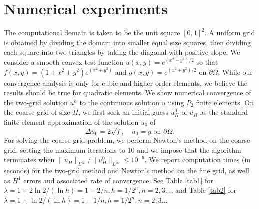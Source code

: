 \documentclass[12pt]{amsart}
\numberwithin{equation}{section}
\begin{document}
\section{Numerical experiments}\label{num}


The computational domain is taken to be the unit square $[0,1]^2$. 
A uniform grid is obtained by dividing the domain into smaller equal size squares, then dividing each square into two triangles by taking the diagonal with positive slope. 
We consider a smooth convex test function $u(x,y)=e^{(x^2+y^2)/2}$ so that 
$f(x,y)=(1+x^2+y^2)e^{(x^2+y^2)}$ and $g(x,y)=e^{(x^2+y^2)/2}$ on $\partial \Omega$. 
While our convergence analysis is only for cubic and higher order elements, we believe the results should be true for quadratic elements. We show numerical convergence of the two-grid solution $u^h$ to the continuous solution $u$ using $P_2$ finite elements.
On the coarse grid of size $H$, we first seek an initial guess $u_H^0$ of $u_H$ as the standard finite element approximation of the solution $u_0$ of
\begin{equation*}
\Delta u_0=2\sqrt{f}, \quad u_0=g \text{ on } \partial \Omega.
\end{equation*}
For solving the coarse grid problem, we perform Newton's method on the coarse grid, setting the maximum iterations to 10 and we impose that the algorithm terminates when 
$\|u_H\|_{L^{\infty}}/ \|u^0_H\|_{L^{\infty}} \leq 10^{-6}.$
We report computation times (in seconds) for the two-grid method and Newton's method on the fine grid, as well as  $H^1$ errors and associated rate of convergence. 
See Table \ref{tab1} for $\lambda=1+ 2 \ln 2/(\ln h) =1-2/n, h=1/2^n, n=2, 3 \ldots$, and Table \ref{tab2} for $\lambda=1+  \ln 2/(\ln h)=1-1/n, h=1/2^n, n=2, 3 \ldots$
\end{document}
